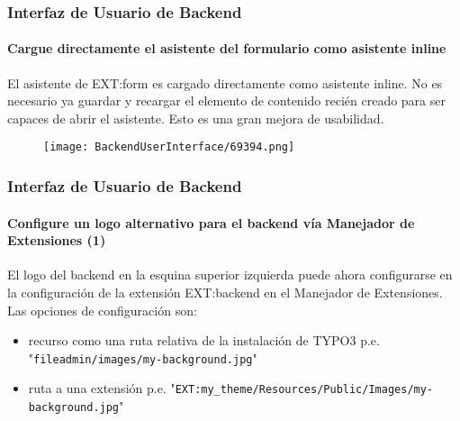 \begin{frame}[fragile]
	\frametitle{Interfaz de Usuario de Backend}
	\framesubtitle{Cargue directamente el asistente del formulario como asistente inline}

	El asistente de EXT:form es cargado directamente como asistente inline.
	No es necesario ya guardar y recargar el elemento de contenido recién creado para ser capaces de abrir el asistente. Esto es una gran mejora de usabilidad.

	\begin{figure}
		\texttt{[image: BackendUserInterface/69394.png]}
	\end{figure}

\end{frame}

\begin{frame}[fragile]
	\frametitle{Interfaz de Usuario de Backend}
	\framesubtitle{Configure un logo alternativo para el backend vía Manejador de Extensiones (1)}

	El logo del backend en la esquina superior izquierda puede ahora configurarse en la configuración de la extensión
	EXT:backend en el Manejador de Extensiones.\newline
	Las opciones de configuración son:

	\begin{itemize}
		\item recurso como una ruta relativa de la instalación de TYPO3\newline
			\smaller
				p.e. "\texttt{fileadmin/images/my-background.jpg}"
			\normalsize

		\item ruta a una extensión\newline
			\smaller
				p.e. "\texttt{EXT:my\_theme/Resources/Public/Images/my-background.jpg}"
			\normalsize
	\end{itemize}

\end{frame}

